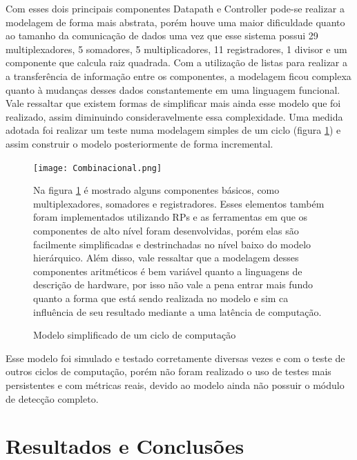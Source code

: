 \documentclass[conference]{IEEEtran}
\begin{document}
Com esses dois principais componentes Datapath e Controller pode-se realizar a modelagem de forma mais abstrata, porém houve uma maior dificuldade quanto ao tamanho da comunicação de dados uma vez que esse sistema possui 29 multiplexadores, 5 somadores, 5 multiplicadores, 11 registradores, 1 divisor e um componente que calcula raiz quadrada. Com a utilização de listas para realizar a a transferência de informação entre os componentes, a modelagem ficou complexa quanto à mudanças desses dados constantemente em uma linguagem funcional. Vale ressaltar que existem formas de simplificar mais ainda esse modelo que foi realizado, assim diminuindo consideravelmente essa complexidade. Uma medida adotada foi realizar um teste numa modelagem simples de  um ciclo (figura \ref{combinacional})  e assim construir o modelo posteriormente de forma incremental. 
\begin{figure}[htbp]
	\centerline{\texttt{[image: Combinacional.png]}}
	\caption{Modelo simplificado de um ciclo de computação}
	\label{combinacional}
Na figura \ref{combinacional} é mostrado alguns componentes básicos, como multiplexadores, somadores e registradores. Esses elementos também foram implementados utilizando RPs e as ferramentas em que os componentes de alto nível foram desenvolvidas, porém elas são facilmente simplificadas e destrinchadas no nível baixo do modelo hierárquico. Além disso, vale ressaltar que a modelagem desses componentes aritméticos é bem variável quanto a linguagens de descrição de hardware, por isso não vale a pena entrar mais fundo quanto a forma que está sendo realizada no modelo e sim ca influência de seu resultado mediante a uma latência de computação. 
\end{figure}

Esse modelo foi simulado e testado corretamente diversas vezes e com o teste de outros ciclos de computação, porém não foram realizado o uso de testes mais persistentes e com métricas reais, devido ao modelo ainda não possuir o módulo de detecção completo.
	\section{Resultados e Conclusões}
	
\end{document}

